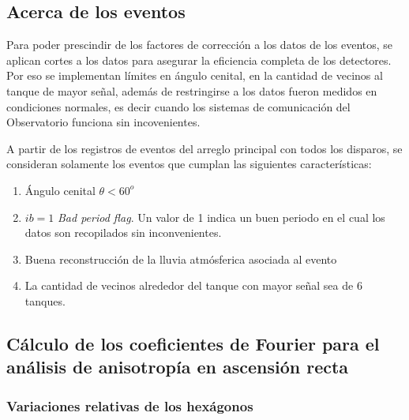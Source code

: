 \subsection{Acerca de los eventos} \label{filtro}

Para poder prescindir de los factores de corrección a los datos de los eventos, se aplican cortes a los datos para asegurar la eficiencia completa de los detectores. Por eso se implementan  límites en ángulo cenital, en la cantidad de vecinos al tanque de mayor señal, además de restringirse a los datos fueron medidos en condiciones normales, es decir cuando los sistemas de comunicación del Observatorio funciona sin incovenientes.


A partir de los registros de eventos del arreglo principal con todos los disparos, se consideran solamente los eventos que cumplan las siguientes características:

    \begin{enumerate}
      \item Ángulo cenital $\theta < 60^o$
      \item $ib=1$ \emph{Bad period flag}. Un valor de 1 indica un buen periodo en el cual los datos son recopilados sin inconvenientes.
      \item Buena reconstrucción de la lluvia atmósferica asociada al evento
      \item La cantidad de vecinos alrededor del tanque con mayor señal sea de 6 tanques.
    \end{enumerate}
   
\subsection{Cálculo de los coeficientes de Fourier para el análisis de anisotropía en ascensión recta}

  \subsubsection{Variaciones relativas de los hexágonos} \label{peso_hexagonos}

